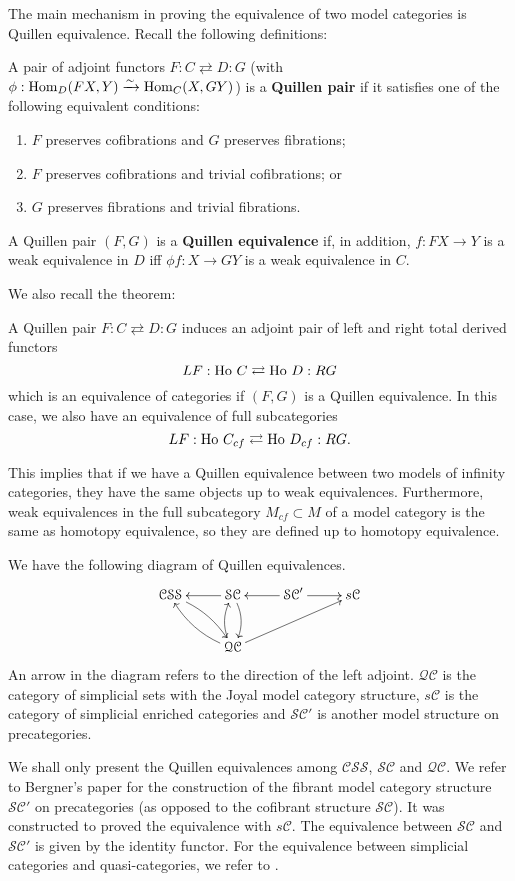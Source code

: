 \begin{refsection}
The main mechanism in proving the equivalence of two model categories is Quillen equivalence. Recall the following definitions:
\begin{defin}
A pair of adjoint functors $F:C\rightleftarrows D:G$ (with $\phi:\mathrm{Hom}_D(FX,Y)\xrightarrow{\sim}\mathrm{Hom}_C(X,GY)$) is a \textbf{Quillen pair} if it satisfies one of the following equivalent conditions:
\begin{enumerate}
\item $F$ preserves cofibrations and $G$ preserves fibrations;
\item $F$ preserves cofibrations and trivial cofibrations; or
\item $G$ preserves fibrations and trivial fibrations.
\end{enumerate}
A Quillen pair $(F,G)$ is a \textbf{Quillen equivalence} if, in addition, $f:FX\to Y$ is a weak equivalence in $D$ iff $\phi f:X\to GY$ is a weak equivalence in $C$.
\end{defin}
We also recall the theorem:
\begin{thm}
A Quillen pair $F:C\rightleftarrows D:G$ induces an adjoint pair of left and right total derived functors
$$LF:\operatorname{\mathrm{Ho} \,} C\rightleftarrows\operatorname{\mathrm{Ho} \,} D:RG$$
which is an equivalence of categories if $(F,G)$ is a Quillen equivalence. In this case, we also have an equivalence of full subcategories
$$LF:\operatorname{\mathrm{Ho} \,} C_{cf}\rightleftarrows\operatorname{\mathrm{Ho} \,} D_{cf}:RG.$$
\end{thm}
This implies that if we have a Quillen equivalence between two models of infinity categories, they have the same objects up to weak equivalences. Furthermore, weak equivalences in the full subcategory $M_{cf}\subset M$ of a model category is the same as homotopy equivalence, so they are defined up to homotopy equivalence.

We have the following diagram of Quillen equivalences.
$$\xymatrix{\mathcal{CSS}\ar@/^/[dr]&\mathcal{SC}\ar[l]\ar@/^/[d]&\mathcal{SC}'\ar[l]\ar[r]&s\mathcal{C}\\
&\mathcal{QC}\ar@/^/[ul]\ar@/^/[u]\ar[urr]}$$
An arrow in the diagram refers to the direction of the left adjoint. $\mathcal{QC}$ is the category of simplicial sets with the Joyal model category structure, $s\mathcal{C}$ is the category of simplicial enriched categories and $\mathcal{SC}'$ is another model structure on precategories.

We shall only present the Quillen equivalences among $\mathcal{CSS}$, $\mathcal{SC}$ and $\mathcal{QC}$. We refer to Bergner's paper \cite{bergner3} for the construction of the fibrant model category structure $\mathcal{SC}'$ on precategories (as opposed to the cofibrant structure $\mathcal{SC}$). It was constructed to proved the equivalence with $s\mathcal{C}$. The equivalence between $\mathcal{SC}$ and $\mathcal{SC}'$ is given by the identity functor. For the equivalence between simplicial categories and quasi-categories, we refer to \cite{joyal3}.


\end{refsection}
